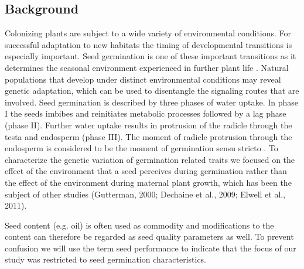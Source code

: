 \subsection{Background}
Colonizing plants are subject to a wide variety of environmental conditions. For successful adaptation 
to new habitats the timing of developmental transitions is especially important. Seed germination is 
one of these important transitions as it determines the seasonal environment experienced in further 
plant life \cite{Huang:2010}. Natural populations that develop under distinct environmental conditions 
may reveal genetic adaptation, which can be used to disentangle the signaling routes that are involved. 
Seed germination is described by three phases of water uptake. In phase I the seeds imbibes and 
reinitiates metabolic processes followed by a lag phase (phase II). Further water uptake results in 
protrusion of the radicle through the testa and endosperm (phase III). The moment of radicle 
protrusion through the endosperm is considered to be the moment of germination sensu stricto 
\cite{Finch-Savage:2006}. To characterize the genetic variation of germination related traits we 
focused on the effect of the environment that a seed perceives during germination rather than the 
effect of the environment during maternal plant growth, which has been the subject of other 
studies (Gutterman, 2000; Dechaine et al., 2009; Elwell et al., 2011). 

Seed content (e.g. oil) is often used as commodity and modifications to the content can therefore be 
regarded as seed quality parameters as well. To prevent confusion we will use the term seed performance 
to indicate that the focus of our study was restricted to seed germination characteristics.

